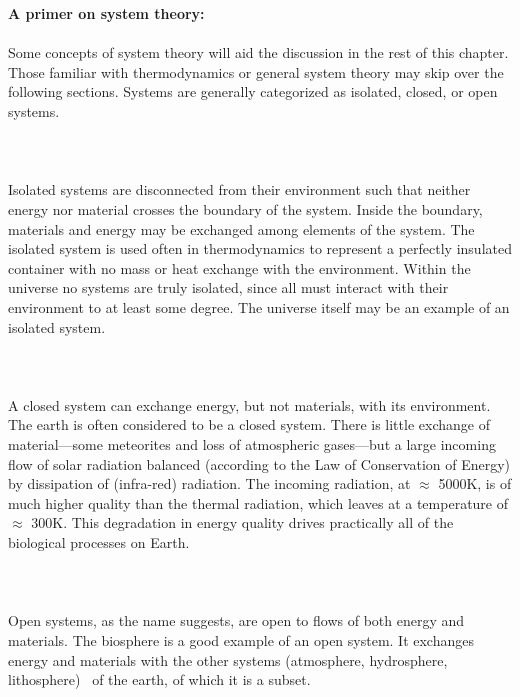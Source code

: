 \begin{svgraybox}
{\large \textbf{A primer on system theory:}}
\\\\
Some concepts of system theory will aid the discussion
in the rest of this chapter.
Those familiar with thermodynamics or general system
theory may skip over the following sections.
Systems are generally categorized as 
isolated, closed, or open systems.
\\\\
\\\\
Isolated systems %
are disconnected from their environment
such that neither energy nor material crosses the
boundary of the system.
Inside the boundary,
materials and energy may be exchanged
among elements of the system.
The isolated system is used often
in thermodynamics to represent a
perfectly insulated container with no mass or heat exchange
with the environment.
Within the universe no systems are truly isolated,
since all must interact with their environment
to at least some degree.
The universe itself may be an example of an 
isolated system.
\\\\
\\\\
A closed system %
can exchange energy, but not materials,
with its environment.
The earth is often considered to be a closed system.
There is little exchange of material---some meteorites
and loss of atmospheric gases---but a large incoming
flow of solar radiation balanced (according to the 
Law of Conservation of Energy) by dissipation of (infra-red) radiation.
The incoming radiation, at $\approx$ 5000K, is of much
higher quality than the thermal radiation, which leaves at a 
temperature of $\approx$ 300K.
This degradation in energy quality drives practically
all of the biological processes on Earth.
\\\\ 
\\\\
Open systems, %
as the name suggests, are open
to flows of both energy and materials.
The biosphere is a good example of an open system.
It exchanges energy and materials with the other systems
(atmosphere, hydrosphere, lithosphere)~\cite{Johnson1997}
of the earth, of which it is a subset.

\end{svgraybox}
